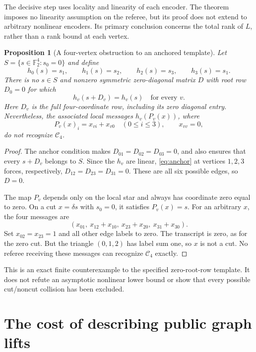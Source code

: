 \documentclass[11pt]{article}
\newtheorem{proposition}[theorem]{Proposition}
\theoremstyle{remark}
\newcommand{\F}{\mathbb F_2}
\newcommand{\Cut}{\mathcal C}
\begin{document}
The decisive step uses locality and linearity of each encoder.
The theorem imposes no linearity assumption on the referee, but its
proof does not extend to arbitrary nonlinear encoders. Its primary
conclusion concerns the total rank of $L$, rather than a rank bound
at each vertex.

\begin{proposition}[A four-vertex obstruction to an anchored template]
\label{prop:anchor}
Let $S=\{s\in\F^4:s_0=0\}$ and define
\[
 h_0(s)=s_1,\qquad h_1(s)=s_2,\qquad
 h_2(s)=s_3,\qquad h_3(s)=s_1.
\]
There is no $s\in S$ and nonzero symmetric zero-diagonal matrix $D$
with root row $D_0=0$ for which
\begin{equation}\label{eq:anchor}
 h_v(s+D_v)=h_v(s)\quad\text{for every }v.
\end{equation}
Here $D_v$ is the full four-coordinate row, including its zero diagonal
entry. Nevertheless, the associated local messages
$h_v(P_v(x))$, where
\[
 P_v(x)_i=x_{vi}+x_{v0}\quad(0\le i\le3),\qquad x_{vv}=0,
\]
do not recognize $\Cut_4$.
\end{proposition}

\begin{proof}
The anchor condition makes $D_{01}=D_{02}=D_{03}=0$, and also ensures
that every $s+D_v$ belongs to $S$. Since the $h_v$ are linear,
\eqref{eq:anchor} at vertices $1,2,3$ forces, respectively,
$D_{12}=D_{23}=D_{31}=0$. These are all six possible edges, so $D=0$.

The map $P_v$ depends only on the local star and always has coordinate
zero equal to zero. On a cut $x=\delta s$ with $s_0=0$, it satisfies
$P_v(x)=s$. For an arbitrary $x$, the four messages are
\[
 (x_{01},\ x_{12}+x_{10},\ x_{23}+x_{20},\ x_{31}+x_{30}).
\]
Set $x_{02}=x_{23}=1$ and all other edge labels to zero. The transcript
is zero, as for the zero cut. But the triangle $(0,1,2)$ has label sum
one, so $x$ is not a cut. No referee receiving these messages can
recognize $\Cut_4$ exactly.
\end{proof}

This is an exact finite counterexample to the specified zero-root-row
template. It does not refute an asymptotic nonlinear lower bound or
show that every possible cut/noncut collision has been excluded.

\section{The cost of describing public graph lifts}
\end{document}
